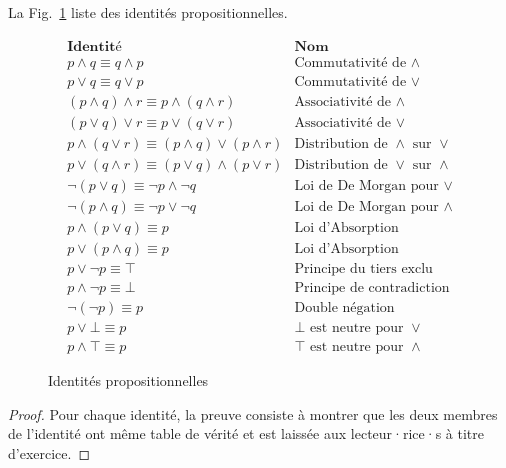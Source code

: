 \documentclass[french,course,oneside,theoremnosection]{lecture}
\newenvironment{further}[1]
{\begin{tcolorbox}[colframe=gray!50, colback=gray!5, arc=0pt, outer arc=0pt, boxrule=0.5pt, title=#1, breakable]}
{\end{tcolorbox}}
\begin{document}
\begin{proposition}
La Fig.~\ref{fig:ide} liste des identités propositionnelles.
\begin{figure}
\[
\begin{array}{ll}
\textbf{Identité} & \textbf{Nom} \\
\hline
p \wedge q \equiv q \wedge p & \text{Commutativité de } \wedge \\
p \vee q \equiv q \vee p & \text{Commutativité de } \vee \\
(p \wedge q) \wedge r \equiv p \wedge (q \wedge r) & \text{Associativité de } \wedge \\
(p \vee q) \vee r \equiv p \vee (q \vee r) & \text{Associativité de } \vee \\
p \wedge (q \vee r) \equiv (p \wedge q) \vee (p \wedge r) & \text{Distribution de } \wedge \text{ sur } \vee \\
p \vee (q \wedge r) \equiv (p \vee q) \wedge (p \vee r) & \text{Distribution de } \vee \text{ sur } \wedge \\
\neg (p \vee q) \equiv \neg p \wedge \neg q & \text{Loi de De Morgan pour } \vee \\
\neg (p \wedge q) \equiv \neg p \vee \neg q & \text{Loi de De Morgan pour } \wedge \\
p \wedge (p \vee q) \equiv p & \text{Loi d'Absorption} \\
p \vee (p \wedge q) \equiv p & \text{Loi d'Absorption} \\
p \vee \neg p \equiv \top& \text{Principe du tiers exclu} \\
p \wedge \neg p \equiv \bot& \text{Principe de contradiction} \\
\neg (\neg p) \equiv p & \text{Double négation} \\
p \vee \bot \equiv p & \text{$\bot$ est neutre pour $\vee$}\\
p \wedge \top \equiv p &\text{$\top$ est neutre pour $\wedge$}
\end{array}
\]\caption{Identités propositionnelles}\label{fig:ide}
\end{figure}
\end{proposition}
\begin{proof}
Pour chaque identité, la preuve consiste à montrer que les deux membres de l'identité ont même table de vérité et est laissée aux lecteur·rice·s à titre d'exercice.
\end{proof}

\end{document}
